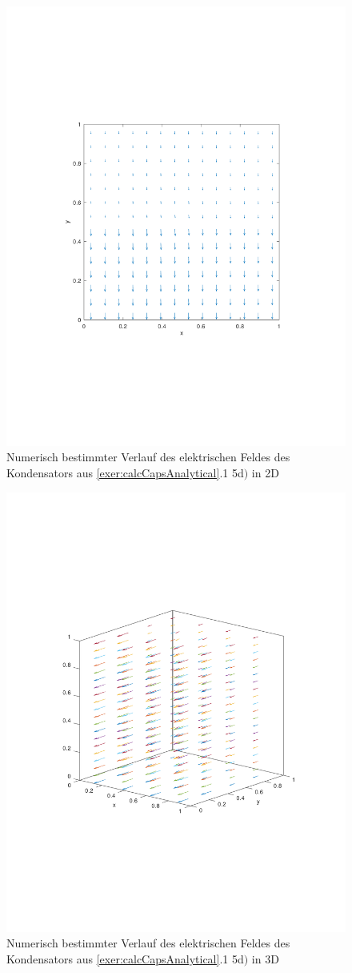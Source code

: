 \documentclass[Protokollheft.tex]{subfiles}
\begin{document}
\begin{figure}[h!]
	\centering
	\includegraphics[trim = 20mm 70mm 20mm 70mm, clip,width=0.7\linewidth]{E_2D_D.pdf}
	\caption{Numerisch bestimmter Verlauf des elektrischen Feldes des Kondensators aus \ref{exer:calcCapsAnalytical}.1 5d$)$ in 2D}
\end{figure}

\begin{figure}[h!]
	\centering
	\includegraphics[trim = 20mm 70mm 20mm 70mm, clip,width=0.7\linewidth]{E_3D_D.pdf}
	\caption{Numerisch bestimmter Verlauf des elektrischen Feldes des Kondensators aus \ref{exer:calcCapsAnalytical}.1 5d$)$ in 3D}
\end{figure}
\end{document}
